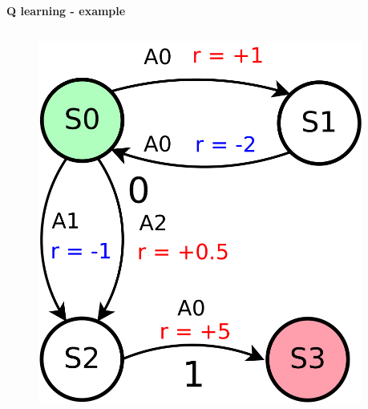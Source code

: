 \documentclass[xcolor=dvipsnames]{beamer}
\begin{document}
\begin{frame}{\bf Q learning - example}


\begin{columns}
    \begin{column}{0.5\textwidth}

        \begin{figure}
          \includegraphics[scale=0.15]{../../diagrams/q_learning_example_03.png}
        \end{figure}

    \end{column}
    \begin{column}{0.5\textwidth}

    {\footnotesize


}
\end{column}
\end{columns}
\end{frame}
\end{document}
